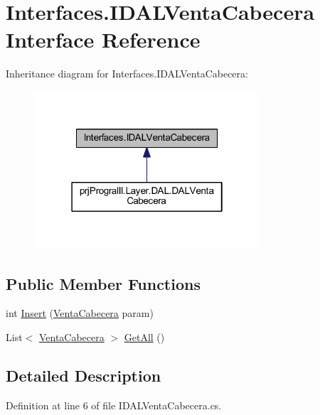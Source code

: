 \hypertarget{interface_interfaces_1_1_i_d_a_l_venta_cabecera}{}\section{Interfaces.\+I\+D\+A\+L\+Venta\+Cabecera Interface Reference}
\label{interface_interfaces_1_1_i_d_a_l_venta_cabecera}


Inheritance diagram for Interfaces.\+I\+D\+A\+L\+Venta\+Cabecera\+:
\nopagebreak
\begin{figure}[H]
\begin{center}
\leavevmode
\includegraphics[width=238pt]{interface_interfaces_1_1_i_d_a_l_venta_cabecera__inherit__graph}
\end{center}
\end{figure}
\subsection*{Public Member Functions}
\begin{DoxyCompactItemize}
\item 
int \hyperlink{interface_interfaces_1_1_i_d_a_l_venta_cabecera_a7da4b1733d4a28cbfe906d018d344355}{Insert} (\hyperlink{classprj_progra_i_i_i_1_1_layer_1_1_entities_1_1_venta_cabecera}{Venta\+Cabecera} param)
\item 
List$<$ \hyperlink{classprj_progra_i_i_i_1_1_layer_1_1_entities_1_1_venta_cabecera}{Venta\+Cabecera} $>$ \hyperlink{interface_interfaces_1_1_i_d_a_l_venta_cabecera_a24d7801773ac5c75332be9f7efdd04b9}{Get\+All} ()
\end{DoxyCompactItemize}


\subsection{Detailed Description}


Definition at line 6 of file I\+D\+A\+L\+Venta\+Cabecera.\+cs.



